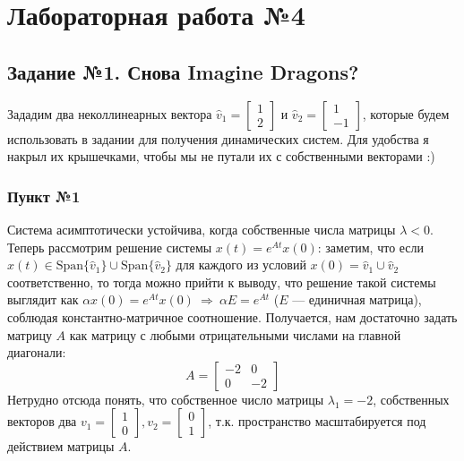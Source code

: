 \documentclass[a3paper,14pt]{extarticle}
\begin{document}
\section*{\centering Лабораторная работа №4}
\subsection*{\centering Задание №1. Снова Imagine Dragons?}
Зададим два неколлинеарных вектора $\hat{v}_1 = \left[\begin{smallmatrix}
    1 \\ 2
\end{smallmatrix}\right]$ и $\hat{v}_2 = \left[\begin{smallmatrix}
    1 \\ -1
\end{smallmatrix}\right]$, которые будем использовать в задании для получения динамических систем. Для удобства я накрыл их крышечками, чтобы мы не путали их с собственными векторами :)
\subsubsection*{Пункт №1}
Система асимптотически устойчива, когда собственные числа матрицы $\lambda < 0$. Теперь рассмотрим решение системы $x(t) = e^{At}x(0)$: заметим, что если $x(t) \in \text{Span}\{\hat{v}_1\} \cup \text{Span}\{\hat{v}_2\}$ для каждого из условий $x(0) = \hat{v}_1 \cup \hat{v}_2$ соответственно, то тогда можно прийти к выводу, что решение такой системы выглядит как $\alpha x(0) = e^{At}x(0)\ \Rightarrow\ \alpha E = e^{At}$ ($E$ --- единичная матрица), соблюдая константно-матричное соотношение. Получается, нам достаточно задать матрицу $A$ как матрицу с любыми отрицательными числами на главной диагонали:
$$A = \begin{bmatrix}
    -2 & 0 \\ 0 & -2
\end{bmatrix}$$
Нетрудно отсюда понять, что собственное число матрицы $\lambda_1 = -2$, собственных векторов два $v_1=\left[\begin{smallmatrix}
    1 \\ 0
\end{smallmatrix}\right], v_2= \left[\begin{smallmatrix}
    0 \\ 1
\end{smallmatrix}\right]$, т.к. пространство масштабируется под действием матрицы $A$.
\end{document}
